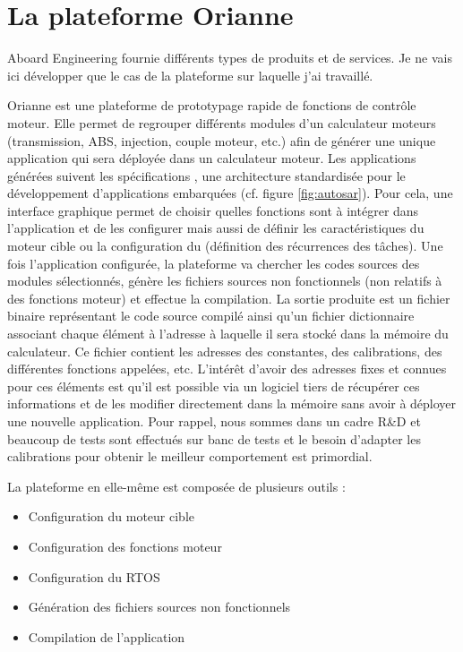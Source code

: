 \section{La plateforme Orianne}
\label{sec:orianne}

Aboard Engineering fournie différents types de produits et de services. Je ne vais ici développer que le cas de la plateforme  sur laquelle j'ai travaillé.

Orianne est une plateforme de prototypage rapide de fonctions de contrôle
moteur. Elle permet de regrouper différents modules d'un calculateur moteurs
(transmission, ABS, injection, couple moteur, etc.) afin de générer une unique
application qui sera déployée dans un calculateur moteur. Les applications
générées suivent les spécifications , une architecture
standardisée pour le dévelop\-pement d'applications embarquées (cf. figure
\ref{fig:autosar}).
Pour cela, une interface graphique permet de choisir quelles fonctions sont à intégrer dans
l'application et de les configurer  mais aussi de définir les caractéristiques du moteur
cible ou la configuration du  (définition des récurrences des
tâches).  Une fois l'application configurée, la plateforme va chercher les codes
sources des modules sélectionnés, génère les fichiers sources non fonctionnels
(non relatifs à des fonctions moteur) et effectue la compilation.  La sortie
produite est un fichier binaire représentant le code source compilé ainsi qu'un
fichier \og dictionnaire \fg{} associant chaque élément à l'adresse à laquelle
il sera stocké dans la mémoire du calculateur. Ce fichier contient les adresses
des constantes, des calibrations, des différentes fonctions appelées, etc.
L'intérêt d'avoir des adresses fixes et connues pour ces éléments est qu'il est
possible via un logiciel tiers de récupérer ces informations et de les modifier
directement dans la mémoire sans avoir à déployer une nouvelle application. Pour
rappel, nous sommes dans un cadre R\&D et beaucoup de tests sont effectués sur
banc de tests et le besoin d'adapter les calibrations pour obtenir le meilleur
comportement est primordial.

La plateforme en elle-même est composée de plusieurs outils :
\begin{itemize}
	\item Configuration du moteur cible
	\item Configuration des fonctions moteur
	\item Configuration du RTOS
	\item Génération des fichiers sources non fonctionnels
	\item Compilation de l'application
\end{itemize}

